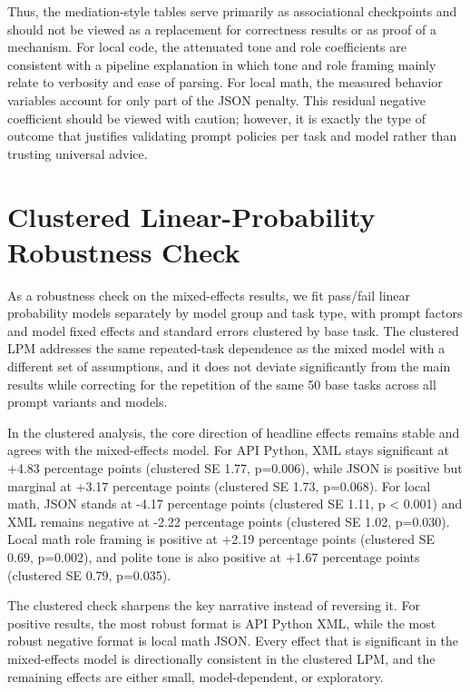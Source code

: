 Thus, the mediation-style tables serve primarily as associational checkpoints and should not be viewed as a replacement for correctness results or as proof of a mechanism. For local code, the attenuated tone and role coefficients are consistent with a pipeline explanation in which tone and role framing mainly relate to verbosity and ease of parsing. For local math, the measured behavior variables account for only part of the JSON penalty. This residual negative coefficient should be viewed with caution; however, it is exactly the type of outcome that justifies validating prompt policies per task and model rather than trusting universal advice.

\section{Clustered Linear-Probability Robustness Check\label{sec:lpm-robustness}}

As a robustness check on the mixed-effects results, we fit pass/fail linear probability models separately by model group and task type, with prompt factors and model fixed effects and standard errors clustered by base task. The clustered LPM addresses the same repeated-task dependence as the mixed model with a different set of assumptions, and it does not deviate significantly from the main results while correcting for the repetition of the same 50 base tasks across all prompt variants and models.

In the clustered analysis, the core direction of headline effects remains stable and agrees with the mixed-effects model. For API Python, XML stays significant at +4.83 percentage points (clustered SE 1.77, p=0.006), while JSON is positive but marginal at +3.17 percentage points (clustered SE 1.73, p=0.068). For local math, JSON stands at -4.17 percentage points (clustered SE 1.11, p \textless{} 0.001) and XML remains negative at -2.22 percentage points (clustered SE 1.02, p=0.030). Local math role framing is positive at +2.19 percentage points (clustered SE 0.69, p=0.002), and polite tone is also positive at +1.67 percentage points (clustered SE 0.79, p=0.035).

The clustered check sharpens the key narrative instead of reversing it. For positive results, the most robust format is API Python XML, while the most robust negative format is local math JSON. Every effect that is significant in the mixed-effects model is directionally consistent in the clustered LPM, and the remaining effects are either small, model-dependent, or exploratory.

